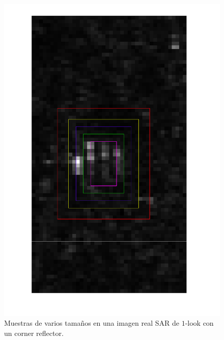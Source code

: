 \begin{figure}[H]
	\centering
	\includegraphics[angle =90,width=.8\linewidth,]{../../Figures/Tesis/Capitulo6/CornerReg}
	\caption{\label{MuestrasCorner} Muestras de varios tamaños en una imagen real SAR de $1$-look con un corner reflector.}
\end{figure}

